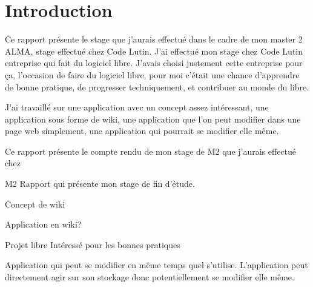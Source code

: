 \section*{Introduction}

Ce rapport présente le stage que j'aurais effectué dans le cadre de mon master 2 ALMA, stage effectué chez Code Lutin. J'ai effectué mon stage chez Code Lutin entreprise qui fait du logiciel libre. J'avais choisi justement cette entreprise pour ça, l'occasion de faire du logiciel libre, pour moi c'était une chance d'apprendre de bonne pratique, de progresser techniquement, et contribuer au monde du libre.

J'ai travaillé sur une application avec un concept assez intéressant, une application sous forme de wiki, une application que l'on peut modifier dans une page web simplement, une application qui pourrait se modifier elle même.


Ce rapport présente le compte rendu de mon stage de M2 que j'aurais effectué chez 

M2
Rapport qui présente mon stage de fin d'étude.

Concept de wiki

Application en wiki?

Projet libre 
Intéressé pour les bonnes pratiques

Application qui peut se modifier en même temps quel s'utilise.
L'application peut directement agir sur son stockage donc potentiellement se modifier elle même.
